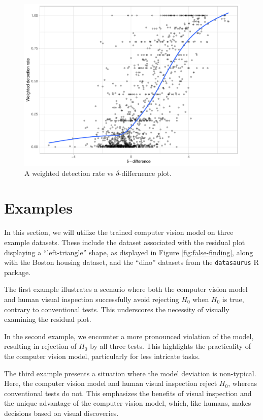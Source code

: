 \documentclass[]{interact}
\theoremstyle{plain}%
\theoremstyle{definition}
\theoremstyle{remark}
\begin{document}
\begin{figure}[!h]

{\centering \includegraphics[width=1\linewidth]{paper_files/figure-latex/delta-1} 

}

\caption{A weighted detection rate vs $\delta$-differnence plot.}\label{fig:delta}
\end{figure}

\section{Examples}\label{examples}

In this section, we will utilize the trained computer vision model on
three example datasets. These include the dataset associated with the
residual plot displaying a ``left-triangle'' shape, as displayed in
Figure \ref{fig:false-finding}, along with the Boston housing dataset,
and the ``dino'' datasets from the \texttt{datasaurus} R package.

The first example illustrates a scenario where both the computer vision
model and human visual inspection successfully avoid rejecting \(H_0\)
when \(H_0\) is true, contrary to conventional tests. This underscores
the necessity of visually examining the residual plot.

In the second example, we encounter a more pronounced violation of the
model, resulting in rejection of \(H_0\) by all three tests. This
highlights the practicality of the computer vision model, particularly
for less intricate tasks.

The third example presents a situation where the model deviation is
non-typical. Here, the computer vision model and human visual inspection
reject \(H_0\), whereas conventional tests do not. This emphasizes the
benefits of visual inspection and the unique advantage of the computer
vision model, which, like humans, makes decisions based on visual
discoveries.
\end{document}
